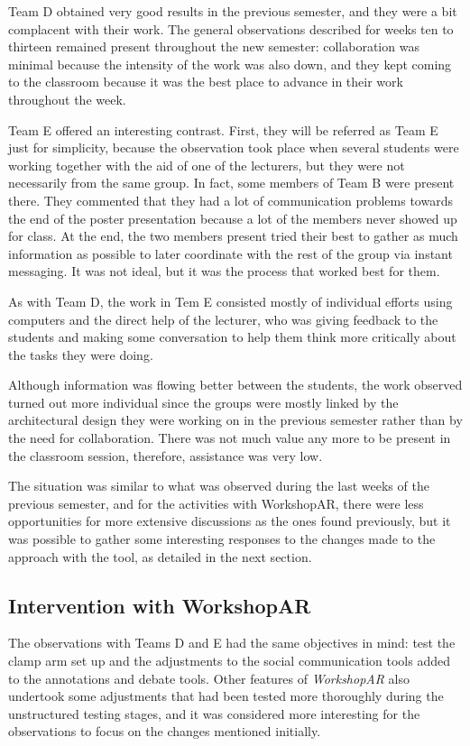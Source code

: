 Team D obtained very good results in the previous semester, and they were a bit complacent with their work. The general observations described for weeks ten to thirteen
remained present throughout the new semester: collaboration was minimal because the intensity of the work was also down, and they kept coming to the classroom because it
was the best place to advance in their work throughout the week.

Team E offered an interesting contrast. First, they will be referred as Team E just for simplicity, because the observation took place when several students were working
together with the aid of one of the lecturers, but they were not necessarily from the same group. In fact, some members of Team B were present there. They commented that
they had a lot of communication problems towards the end of the poster presentation because a lot of the members never showed up for class. At the end, the two members
present tried their best to gather as much information as possible to later coordinate with the rest of the group via instant messaging. It was not ideal, but it was the
process that worked best for them.

As with Team D, the work in Tem E consisted mostly of individual efforts using computers and the direct help of the lecturer, who was giving feedback to the students and
making some conversation to help them think more critically about the tasks they were doing.

Although information was flowing better between the students, the work observed turned out more individual since the groups were mostly linked by the architectural design
they were working on in the previous semester rather than by the need for collaboration. There was not much value any more to be present in the classroom session,
therefore, assistance was very low.

The situation was similar to what was observed during the last weeks of the previous semester, and for the activities with WorkshopAR, there were less opportunities for
more extensive discussions as the ones found previously, but it was possible to gather some interesting responses to the changes made to the approach with the tool, as
detailed in the next section.

\subsection{Intervention with WorkshopAR \label{sec:6-8-2}}

The observations with Teams D and E had the same objectives in mind: test the clamp arm set up and the adjustments to the social communication tools added to the
annotations and debate tools. Other features of \emph{WorkshopAR} also undertook some adjustments that had been tested more thoroughly during the unstructured testing
stages, and it was considered more interesting for the observations to focus on the changes mentioned initially.

